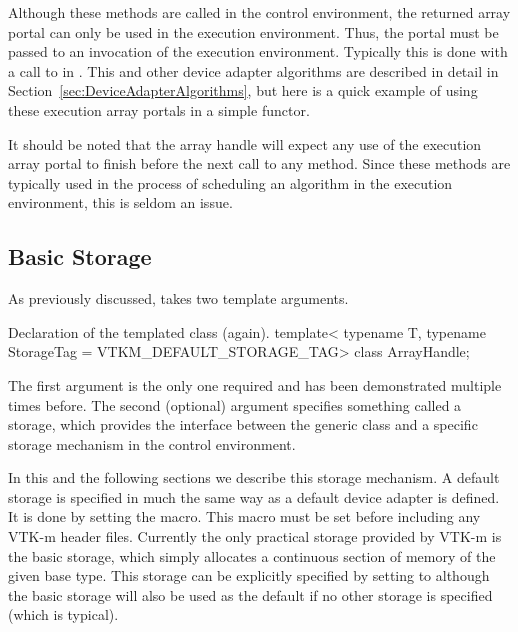 Although these  methods are called in the control
environment, the returned array portal can only be used in the execution
environment. Thus, the portal must be passed to an invocation of the
execution environment. Typically this is done with a call to
 in . This and other
device adapter algorithms are described in detail in
Section~\ref{sec:DeviceAdapterAlgorithms}, but here is a quick example of
using these execution array portals in a simple functor.


It should be noted that the array handle will expect any use of the
execution array portal to finish before the next call to any
 method. Since these  methods
are typically used in the process of scheduling an algorithm in the
execution environment, this is seldom an issue.

\subsection{Basic Storage}


As previously discussed,  takes two template arguments.
\begin{vtkmexample}{Declaration of the \protect{} templated class (again).}
template<
    typename T,
    typename StorageTag = VTKM_DEFAULT_STORAGE_TAG>
class ArrayHandle;
\end{vtkmexample}
The first argument is the only one required and has been demonstrated
multiple times before. The second (optional) argument specifies something
called a storage, which provides the interface between the generic
 class and a specific storage mechanism in the
control environment.

In this and the following sections we describe this storage mechanism.  A
default storage is specified in much the same way as a default device
adapter is defined. It is done by setting the 
macro. This macro must be set before including any VTK-m header
files. Currently the only practical storage provided by VTK-m is the basic
storage, which simply allocates a continuous section of memory of the given
base type. This storage can be explicitly specified by setting
 to  although the
basic storage will also be used as the default if no other storage is
specified (which is typical).

